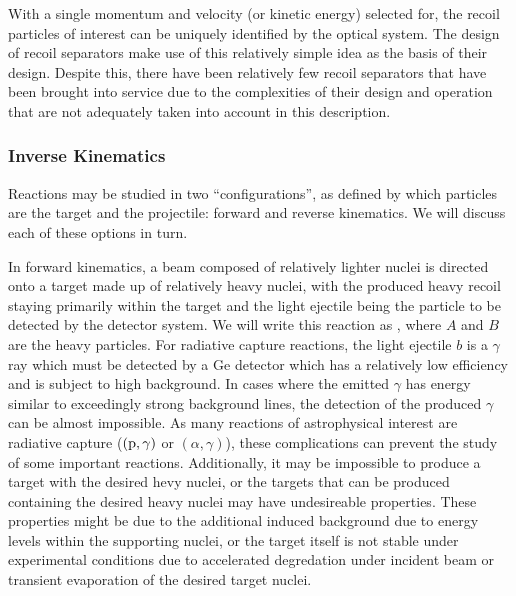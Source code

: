 With a single momentum and
velocity (or kinetic energy) selected for, the recoil particles of interest can
be uniquely identified by the optical system. The design of recoil separators
make use of this relatively simple idea as the basis of their design. Despite
this, there have been relatively few recoil separators that have been brought
into service due to the complexities of their design and operation that are not
adequately taken into account in this description.

\subsubsection{Inverse Kinematics}
Reactions may be studied in two ``configurations'', as defined by which
particles are the target and the projectile: forward and reverse
kinematics. We will discuss each of these options in turn.

In forward kinematics, a beam composed of relatively lighter nuclei
is directed onto a target made up of relatively heavy nuclei, with the produced
heavy recoil staying primarily within the target and the light ejectile being
the particle to be detected by the detector system. We will write this reaction
as , where $A$ and $B$ are the heavy particles. For radiative
capture reactions, the light ejectile $b$ is a $\gamma$ ray which must be
detected by a Ge detector which has a relatively low efficiency and is subject
to high background. In cases where the emitted $\gamma$ has energy similar to
exceedingly strong background lines, the detection of the produced $\gamma$ can
be almost impossible. As many reactions of astrophysical interest are radiative
capture ($(\rm{p},\gamma)$ or $(\alpha,\gamma)$), these complications can
prevent the study of some important reactions. Additionally, it may be
impossible to produce a target with the desired hevy nuclei, or the targets
that can be produced containing the desired heavy nuclei may have undesireable
properties. These properties might be due to the additional induced background
due to energy levels within the supporting nuclei, or the target itself is not
stable under experimental conditions due to accelerated degredation under
incident beam or transient evaporation of the desired target nuclei.

